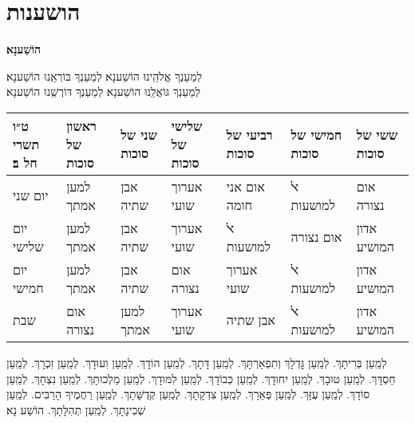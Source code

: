 \documentclass[twoside, openany, parskip=half, 11pt]{book}
\begin{document}
\chapter[הושענות]{ הושענות }
\label{hoshanos}


\begin{Large}
\textbf{
הוֹשַׁענָא׃
}
\end{Large}


לְמַעַנְךָ אֱלֹהֵֽינוּ הוֹשַׁענָא׃ לְמַעַנְךָ בּוֹרְאֵֽנוּ הוֹשַׁענָא׃\\
לְמַעַנְךָ גּוֹאֲלֵֽנוּ הוֹשַׁענָא׃ לְמַעַנְךָ דּוֹרְשֵֽׁנוּ הוֹשַׁענָא׃

\begin{tiny}
\begin{tabular}{>{\centering\arraybackslash}m{}||>{\centering\arraybackslash}m{}|>{\centering\arraybackslash}m{}|>{\centering\arraybackslash}m{}|>{\centering\arraybackslash}m{}|>{\centering\arraybackslash}m{}|>{\centering\arraybackslash}m{}}
ט״ו תשרי חל ב׃ & ראשון של סוכות & שני של סוכות & שלישי של סוכות & רביעי של סוכות & חמישי של סוכות & ששי של סוכות \\
\hline \hline
יום שני & למען אמתך & אבן שתיה & אערוך שועי & אום אני חומה & ﭏ למושעות & אום נצורה\\ \hline
יום שלישי & למען אמתך & אבן שתיה & אערוך שועי & ﭏ למושעות & אום נצורה & אדון המושיע \\ \hline
יום חמישי & למען אמתך & אבן שתיה & אום נצורה & אערוך שועי & ﭏ למושעות & אדון המושיע\\ \hline
שבת & אום נצורה & למען אמתך & אערוך שועי & אבן שתיה & ﭏ למושעות & אדון המושיע
\end{tabular}

\end{tiny}

לְמַֽעַן בְּרִיתָךְ. לְמַֽעַן גׇּדְלָךְ וְתִפְאַרְתָּךְ. לְמַֽעַן דָּתָךְ. לְמַֽעַן הוֹדָךְ. לְמַֽעַן וִעוּדָךְ. לְמַֽעַן זִכְרָךְ. לְמַֽעַן חַסְדָּךְ. לְמַֽעַן טוּבָךְ. לְמַֽעַן יִחוּדָךְ. לְמַֽעַן כְּבוֹדָךְ. לְמַֽעַן לִמּוּדָךְ. לְמַֽעַן מַלְכוּתָךְ. לְמַֽעַן נִצְחָךְ. לְמַֽעַן סוֹדָךְ. לְמַֽעַן עֻזָּךְ. לְמַֽעַן פְּאֵרָךְ. לְמַֽעַן צִדְקָתָךְ. לְמַֽעַן קְדֻשָּׁתָךְ. לְמַֽעַן רַחֲמֶיךָ הָרַבִּים. לְמַֽעַן שְׁכִינָתָךְ. לְמַֽעַן תְּהִלָּתָךְ. הוֹשַׁע נָא׃

\newcommand{\hoshanaraba}[1]{
\instruction{בהושענא רבה אומרים׃}
#1\\
\instruction{
	בשאר ימי סוכות ממשיכים עם אני והו בעמ׳ \pageref{anivho}}
}
\end{document}
